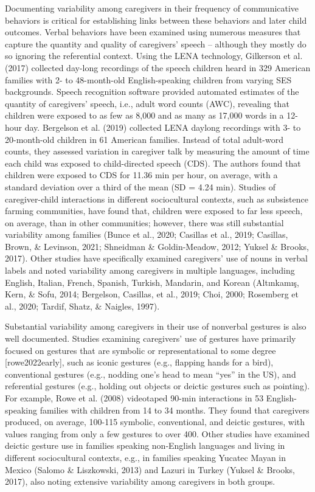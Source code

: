 \documentclass[
  english,
  man,floatsintext]{apa6}
\begin{document}
Documenting variability among caregivers in their frequency of communicative behaviors is critical for establishing links between these behaviors and later child outcomes. Verbal behaviors have been examined using numerous measures that capture the quantity and quality of caregivers' speech -- although they mostly do so ignoring the referential context. Using the LENA technology, Gilkerson et al. (2017) collected day-long recordings of the speech children heard in 329 American families with 2- to 48-month-old English-speaking children from varying SES backgrounds. Speech recognition software provided automated estimates of the quantity of caregivers' speech, i.e., adult word counts (AWC), revealing that children were exposed to as few as 8,000 and as many as 17,000 words in a 12-hour day. Bergelson et al. (2019) collected LENA daylong recordings with 3- to 20-month-old children in 61 American families. Instead of total adult-word counts, they assessed variation in caregiver talk by measuring the amount of time each child was exposed to child-directed speech (CDS). The authors found that children were exposed to CDS for 11.36 min per hour, on average, with a standard deviation over a third of the mean (SD = 4.24 min). Studies of caregiver-child interactions in different sociocultural contexts, such as subsistence farming communities, have found that, children were exposed to far less speech, on average, than in other communities; however, there was still substantial variability among families (Bunce et al., 2020; Casillas et al., 2019; Casillas, Brown, \& Levinson, 2021; Shneidman \& Goldin-Meadow, 2012; Yuksel \& Brooks, 2017). Other studies have specifically examined caregivers' use of nouns in verbal labels and noted variability among caregivers in multiple languages, including English, Italian, French, Spanish, Turkish, Mandarin, and Korean (Altınkamış, Kern, \& Sofu, 2014; Bergelson, Casillas, et al., 2019; Choi, 2000; Rosemberg et al., 2020; Tardif, Shatz, \& Naigles, 1997).

Substantial variability among caregivers in their use of nonverbal gestures is also well documented. Studies examining caregivers' use of gestures have primarily focused on gestures that are symbolic or representational to some degree {[}rowe2022early{]}, such as iconic gestures (e.g., flapping hands for a bird), conventional gestures (e.g., nodding one's head to mean \enquote{yes} in the US), and referential gestures (e.g., holding out objects or deictic gestures such as pointing). For example, Rowe et al. (2008) videotaped 90-min interactions in 53 English-speaking families with children from 14 to 34 months. They found that caregivers produced, on average, 100-115 symbolic, conventional, and deictic gestures, with values ranging from only a few gestures to over 400. Other studies have examined deictic gesture use in families speaking non-English languages and living in different sociocultural contexts, e.g., in families speaking Yucatec Mayan in Mexico (Salomo \& Liszkowski, 2013) and Lazuri in Turkey (Yuksel \& Brooks, 2017), also noting extensive variability among caregivers in both groups.
\end{document}
